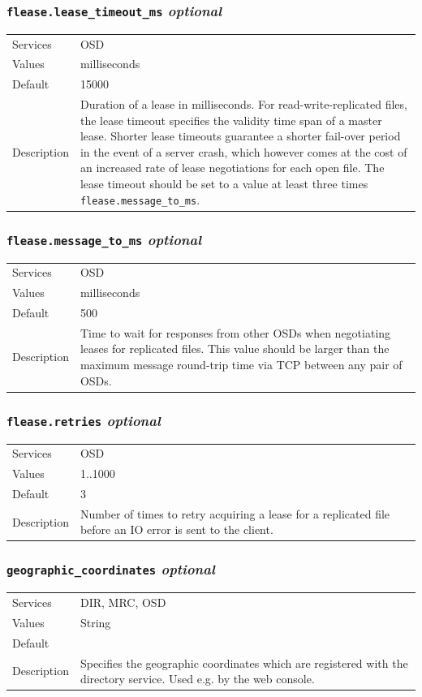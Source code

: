 \documentclass[a4paper,10pt]{book}
\begin{document}
\subsubsection{\texttt{flease.lease\_timeout\_ms} \textit{optional}}
\begin{tabular}{lp{10cm}}
 Services & OSD\\
 Values   & milliseconds \\
 Default  & 15000 \\
 Description & Duration of a lease in milliseconds. For read-write-replicated files, the lease timeout specifies the validity time span of a master lease. Shorter lease timeouts guarantee a shorter fail-over period in the event of a server crash, which however comes at the cost of an increased rate of lease negotiations for each open file. The lease timeout should be set to a value at least three times \texttt{flease.message\_to\_ms}.
\end{tabular}

\subsubsection{\texttt{flease.message\_to\_ms} \textit{optional}}
\begin{tabular}{lp{10cm}}
 Services & OSD\\
 Values   & milliseconds \\
 Default  & 500 \\
 Description & Time to wait for responses from other OSDs when negotiating leases for replicated files. This value should be larger than the maximum message round-trip time via TCP between any pair of OSDs.
\end{tabular}

\subsubsection{\texttt{flease.retries} \textit{optional}}
\begin{tabular}{lp{10cm}}
 Services & OSD\\
 Values   & 1..1000 \\
 Default  & 3 \\
 Description & Number of times to retry acquiring a lease for a replicated file before an IO error is sent to the client.
\end{tabular}

\subsubsection{\texttt{geographic\_coordinates} \textit{optional}}
\begin{tabular}{lp{10cm}}
 Services & DIR, MRC, OSD\\
 Values   & String \\
 Default  & \\
 Description & Specifies the geographic coordinates which are registered with the directory service. Used e.g. by the web console.
\end{tabular}
\end{document}
